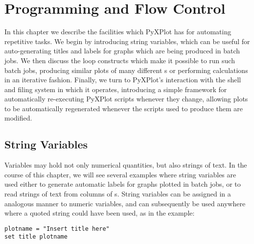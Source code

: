 %
%
%
%
%



\chapter{Programming and Flow Control}

In this chapter we describe the facilities which PyXPlot has for automating
repetitive tasks. We begin by introducing string variables, which can be useful
for auto-generating titles and labels for graphs which are being produced in
batch jobs. We then discuss the loop constructs which make it possible to run
such batch jobs, producing similar plots of many different \datafile s or
performing calculations in an iterative fashion. Finally, we turn to PyXPlot's
interaction with the shell and filing system in which it operates, introducing
a simple framework for automatically re-executing PyXPlot scripts whenever they
change, allowing plots to be automatically regenerated whenever the scripts
used to produce them are modified.

\section{String Variables}
\label{sec:stringvars}

Variables may hold not only numerical quantities, but also strings of text.  In
the course of this chapter, we will see several examples where string variables
are used either to generate automatic labels for graphs plotted in batch jobs,
or to read strings of text from columns of \datafile s. String variables can be
assigned in a analogous manner to numeric variables, and can subsequently be
used anywhere where a quoted string could have been used, as in the example:
\begin{verbatim}
plotname = "Insert title here"
set title plotname
\end{verbatim}

